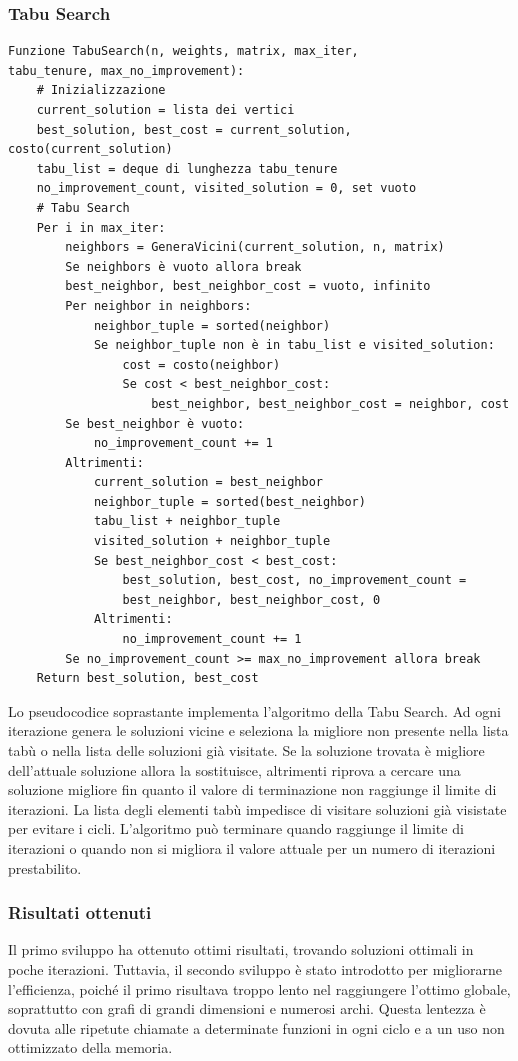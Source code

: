 \documentclass[12pt,a4paper,twoside]{article}
\begin{document}
\subsubsection{Tabu Search}
\begin{verbatim}
Funzione TabuSearch(n, weights, matrix, max_iter, 
tabu_tenure, max_no_improvement):
    # Inizializzazione
    current_solution = lista dei vertici
    best_solution, best_cost = current_solution, costo(current_solution)
    tabu_list = deque di lunghezza tabu_tenure
    no_improvement_count, visited_solution = 0, set vuoto
    # Tabu Search
    Per i in max_iter:
        neighbors = GeneraVicini(current_solution, n, matrix)
        Se neighbors è vuoto allora break
        best_neighbor, best_neighbor_cost = vuoto, infinito
        Per neighbor in neighbors:
            neighbor_tuple = sorted(neighbor)
            Se neighbor_tuple non è in tabu_list e visited_solution:
                cost = costo(neighbor)
                Se cost < best_neighbor_cost:
                    best_neighbor, best_neighbor_cost = neighbor, cost
        Se best_neighbor è vuoto:
            no_improvement_count += 1
        Altrimenti:
            current_solution = best_neighbor
            neighbor_tuple = sorted(best_neighbor)
            tabu_list + neighbor_tuple
            visited_solution + neighbor_tuple
            Se best_neighbor_cost < best_cost:
                best_solution, best_cost, no_improvement_count = 
                best_neighbor, best_neighbor_cost, 0
            Altrimenti:
                no_improvement_count += 1
        Se no_improvement_count >= max_no_improvement allora break
    Return best_solution, best_cost
\end{verbatim}
Lo pseudocodice soprastante implementa l'algoritmo della Tabu Search. Ad ogni iterazione genera le soluzioni vicine e seleziona la migliore non presente nella lista tabù o nella lista delle soluzioni già visitate. Se la soluzione trovata è migliore dell'attuale soluzione allora la sostituisce, altrimenti riprova a cercare una soluzione migliore fin quanto il valore di terminazione non raggiunge il limite di iterazioni. La lista degli elementi tabù impedisce di visitare soluzioni già visistate per evitare i cicli. L'algoritmo può terminare quando raggiunge il limite di iterazioni o quando non si migliora il valore attuale per un numero di iterazioni prestabilito.
\subsubsection{Risultati ottenuti}
Il primo sviluppo ha ottenuto ottimi risultati, trovando soluzioni ottimali in poche iterazioni. Tuttavia, il secondo sviluppo è stato introdotto per migliorarne l'efficienza, poiché il primo risultava troppo lento nel raggiungere l'ottimo globale, soprattutto con grafi di grandi dimensioni e numerosi archi. Questa lentezza è dovuta alle ripetute chiamate a determinate funzioni in ogni ciclo e a un uso non ottimizzato della memoria.
\end{document}
